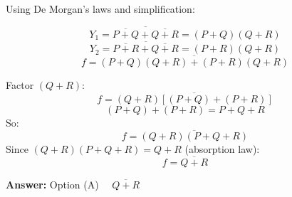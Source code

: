 \documentclass[12pt,a4paper]{article}
\begin{document}
Using De Morgan's laws and simplification:

\[
Y_1 = \overline{\overline{P+Q} + \overline{Q+R}} 
     = (P+Q)(Q+R)
\]
\[
Y_2 = \overline{\overline{P+R} + \overline{Q+R}} 
     = (P+R)(Q+R)
\]
\[
f = \overline{(P+Q)(Q+R) + (P+R)(Q+R)}
\]

Factor $(Q+R)$:
\[
f = \overline{(Q+R)[(P+Q) + (P+R)]}
\]
\[
(P+Q) + (P+R) = P + Q + R
\]
So:
\[
f = \overline{(Q+R)(P+Q+R)}
\]
Since $(Q+R)(P+Q+R) = Q+R$ (absorption law):
\[
f = \overline{Q+R}
\]

\noindent
\textbf{Answer:} Option (A) $\quad \boxed{\overline{Q+R}}$
\end{document}
